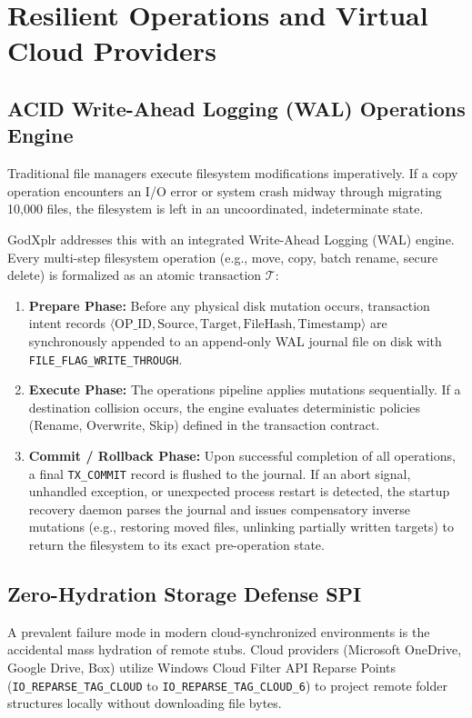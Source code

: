 \documentclass[conference]{IEEEtran}
\begin{document}
\section{Resilient Operations and Virtual Cloud Providers}

\subsection{ACID Write-Ahead Logging (WAL) Operations Engine}
Traditional file managers execute filesystem modifications imperatively. If a copy operation encounters an I/O error or system crash midway through migrating 10,000 files, the filesystem is left in an uncoordinated, indeterminate state.

GodXplr addresses this with an integrated Write-Ahead Logging (WAL) engine. Every multi-step filesystem operation (e.g., move, copy, batch rename, secure delete) is formalized as an atomic transaction $\mathcal{T}$:
\begin{enumerate}
    \item \textbf{Prepare Phase:} Before any physical disk mutation occurs, transaction intent records $\langle \text{OP\_ID}, \text{Source}, \text{Target}, \text{FileHash}, \text{Timestamp} \rangle$ are synchronously appended to an append-only WAL journal file on disk with \texttt{FILE\_FLAG\_WRITE\_THROUGH}.
    \item \textbf{Execute Phase:} The operations pipeline applies mutations sequentially. If a destination collision occurs, the engine evaluates deterministic policies (Rename, Overwrite, Skip) defined in the transaction contract.
    \item \textbf{Commit / Rollback Phase:} Upon successful completion of all operations, a final \texttt{TX\_COMMIT} record is flushed to the journal. If an abort signal, unhandled exception, or unexpected process restart is detected, the startup recovery daemon parses the journal and issues compensatory inverse mutations (e.g., restoring moved files, unlinking partially written targets) to return the filesystem to its exact pre-operation state.
\end{enumerate}

\subsection{Zero-Hydration Storage Defense SPI}
A prevalent failure mode in modern cloud-synchronized environments is the accidental mass hydration of remote stubs. Cloud providers (Microsoft OneDrive, Google Drive, Box) utilize Windows Cloud Filter API Reparse Points (\texttt{IO\_REPARSE\_TAG\_CLOUD} to \texttt{IO\_REPARSE\_TAG\_CLOUD\_6}) to project remote folder structures locally without downloading file bytes.
\end{document}
